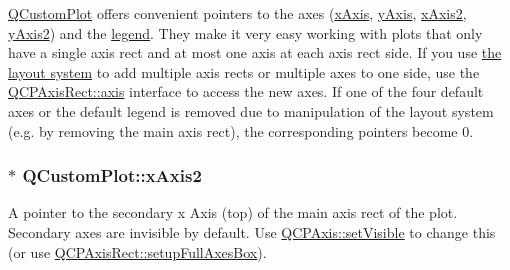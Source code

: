 \hyperlink{classQCustomPlot}{\-Q\-Custom\-Plot} offers convenient pointers to the axes (\hyperlink{classQCustomPlot_a9a79cd0158a4c7f30cbc702f0fd800e4}{x\-Axis}, \hyperlink{classQCustomPlot_af6fea5679725b152c14facd920b19367}{y\-Axis}, \hyperlink{classQCustomPlot_ada41599f22cad901c030f3dcbdd82fd9}{x\-Axis2}, \hyperlink{classQCustomPlot_af13fdc5bce7d0fabd640f13ba805c0b7}{y\-Axis2}) and the \hyperlink{classQCustomPlot_a4eadcd237dc6a09938b68b16877fa6af}{legend}. \-They make it very easy working with plots that only have a single axis rect and at most one axis at each axis rect side. \-If you use \hyperlink{}{the layout system} to add multiple axis rects or multiple axes to one side, use the \hyperlink{classQCPAxisRect_a560de44e47a4af0f86c59102a094b1e4}{\-Q\-C\-P\-Axis\-Rect\-::axis} interface to access the new axes. \-If one of the four default axes or the default legend is removed due to manipulation of the layout system (e.\-g. by removing the main axis rect), the corresponding pointers become 0. \hypertarget{classQCustomPlot_ada41599f22cad901c030f3dcbdd82fd9}{
\subsubsection[{x\-Axis2}]{ $\ast$ {\bf \-Q\-Custom\-Plot\-::x\-Axis2}}}\label{classQCustomPlot_ada41599f22cad901c030f3dcbdd82fd9}
\-A pointer to the secondary x \-Axis (top) of the main axis rect of the plot. \-Secondary axes are invisible by default. \-Use \hyperlink{classQCPLayerable_a3bed99ddc396b48ce3ebfdc0418744f8}{\-Q\-C\-P\-Axis\-::set\-Visible} to change this (or use \hyperlink{classQCPAxisRect_a5fa906175447b14206954f77fc7f1ef4}{\-Q\-C\-P\-Axis\-Rect\-::setup\-Full\-Axes\-Box}).

